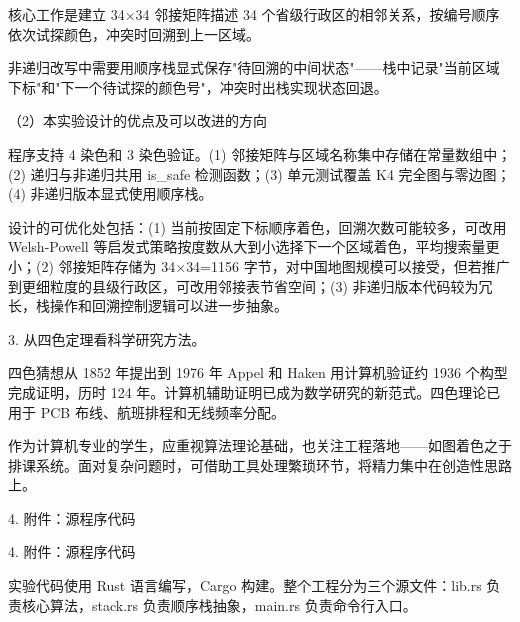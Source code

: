 \noindent\hspace*{2em}核心工作是建立 34$\times$34 邻接矩阵描述 34 个省级行政区的相邻关系，按编号顺序依次试探颜色，冲突时回溯到上一区域。\par
\noindent\hspace*{2em}非递归改写中需要用顺序栈显式保存"待回溯的中间状态"——栈中记录"当前区域下标"和"下一个待试探的颜色号"，冲突时出栈实现状态回退。\par
\noindent\hspace*{2em}（2）本实验设计的优点及可以改进的方向\par
\noindent\hspace*{2em}程序支持 4 染色和 3 染色验证。(1) 邻接矩阵与区域名称集中存储在常量数组中；(2) 递归与非递归共用 is\_safe 检测函数；(3) 单元测试覆盖 K4 完全图与零边图；(4) 非递归版本显式使用顺序栈。\par
\noindent\hspace*{2em}设计的可优化处包括：(1) 当前按固定下标顺序着色，回溯次数可能较多，可改用 Welsh-Powell 等启发式策略按度数从大到小选择下一个区域着色，平均搜索量更小；(2) 邻接矩阵存储为 34$\times$34=1156 字节，对中国地图规模可以接受，但若推广到更细粒度的县级行政区，可改用邻接表节省空间；(3) 非递归版本代码较为冗长，栈操作和回溯控制逻辑可以进一步抽象。\par
\noindent\hspace*{2em}3. 从四色定理看科学研究方法。\par
\noindent\hspace*{2em}四色猜想从 1852 年提出到 1976 年 Appel 和 Haken 用计算机验证约 1936 个构型完成证明，历时 124 年。计算机辅助证明已成为数学研究的新范式。四色理论已用于 PCB 布线、航班排程和无线频率分配。\par
\noindent\hspace*{2em}作为计算机专业的学生，应重视算法理论基础，也关注工程落地——如图着色之于排课系统。面对复杂问题时，可借助工具处理繁琐环节，将精力集中在创造性思路上。\par
\noindent\hspace*{2em}4. 附件：源程序代码\par
\noindent\hspace*{2em}4. 附件：源程序代码\par
\noindent\hspace*{2em}实验代码使用 Rust 语言编写，Cargo 构建。整个工程分为三个源文件：lib.rs 负责核心算法，stack.rs 负责顺序栈抽象，main.rs 负责命令行入口。\par
